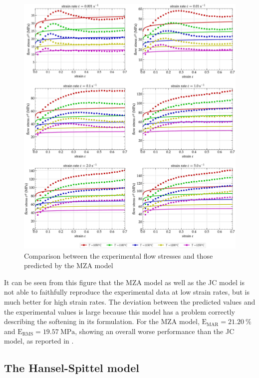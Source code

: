 \documentclass[twoside,english,1p,final,sort&compress]{elsarticle}
\theoremstyle{plain}
\DeclareRobustCommand{\RMSE}{\text{E}_\text{RMS}}
\DeclareRobustCommand{\MARE}{\text{E}_\text{MAR}}
\DeclareRobustCommand{\MPa}{\text{MPa}}
\begin{document}
\begin{figure}[!ht]
\centering
\includegraphics[width=\columnwidth]
{Figures/CompExp-MZA-6}
\caption{Comparison between the experimental flow stresses and those predicted by the MZA model}
\label{fig:CompExp-MZA-6}
\end{figure}
It can be seen from this figure that the MZA model as well as the JC model is not able to faithfully reproduce the experimental data at low strain rates, but is much better for high strain rates.
The deviation between the predicted values and the experimental values is large because this model has a problem correctly describing the softening in its formulation.
For the MZA model, $\MARE=21.20~\%$ and $\RMSE=19.57~\MPa$, showing an overall worse performance than the JC model, as reported in \cite{TizeMha-2022}.

\subsection{The Hansel-Spittel model\label{sec:HSmodel}}
\end{document}
